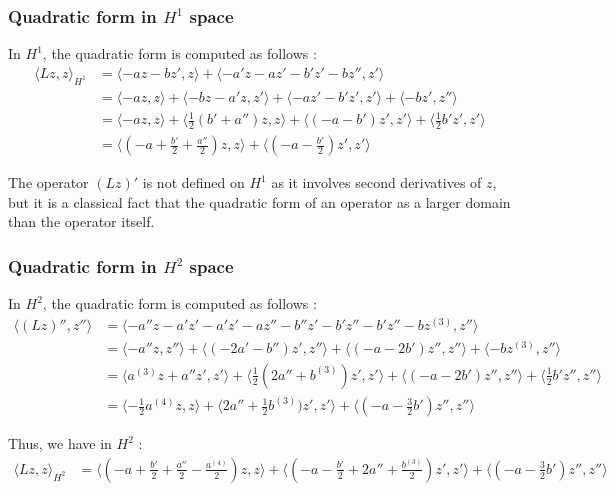 \documentclass[11pt,a4paper]{article}
\begin{document}
\subsubsection{Quadratic form in $H^1$ space}
In $H^1$, the quadratic form is computed as follows :
\begin{align*}
  \langle Lz, z \rangle_{H^1}   &=   \langle -az - bz', z \rangle +  \langle -a'z-az' - b'z'-bz'', z' \rangle \\
  &=  \langle -az, z \rangle + \langle -bz - a'z, z' \rangle + \langle - az'-b'z', z' \rangle + \langle - bz', z'' \rangle \\
  &=  \langle -az, z \rangle + \langle \frac{1}{2}(b'+a'')z, z \rangle + \langle (-a-b')z', z' \rangle + \langle \frac{1}{2} b' z', z' \rangle \\
  &=  \langle (-a+ \frac{b'}{2}+\frac{a''}{2})z, z \rangle +  \langle (-a-\frac{b'}{2})z', z' \rangle 
\end{align*}

\begin{rmq}
The operator $(Lz)'$ is not defined on $H^1$ as it involves second derivatives of $z$, but it is a classical fact that the quadratic form of an operator as a larger domain than the operator itself.
\end{rmq}

\subsubsection{Quadratic form in $H^2$ space}
In $H^2$, the quadratic form is computed as follows :
\begin{align*}
  \langle (Lz)'', z'' \rangle   &=    \langle -a''z-a'z'-a'z'-az''- b''z'-b'z''-b'z''-bz^{(3)}, z'' \rangle \\
  &= \langle -a''z, z'' \rangle +  \langle (-2a'- b'')z', z'' \rangle +  \langle (-a-2b')z'', z'' \rangle + \langle -bz^{(3)}, z'' \rangle \\
  &= \langle a^{(3)}z+ a''z', z' \rangle +  \langle \frac{1}{2} (2a''+ b^{(3)})z', z' \rangle +  \langle (-a-2b')z'', z'' \rangle + \langle \frac{1}{2} b'z'', z'' \rangle \\
  &= \langle - \frac{1}{2}a^{(4)}z, z \rangle +  \langle 2a''+ \frac{1}{2} b^{(3)})z', z' \rangle +  \langle (-a- \frac{3}{2} b')z'', z'' \rangle 
\end{align*}

Thus, we have in $H^2$ :
\begin{align*}
  \langle Lz, z \rangle_{H^2}   &=  \langle (-a+ \frac{b'}{2}+\frac{a''}{2}-\frac{a^{(4)}}{2})z, z \rangle +  \langle (-a-\frac{b'}{2} +2a''+ \frac{ b^{(3)}}{2})z', z' \rangle +  \langle (-a- \frac{3}{2} b')z'', z'' \rangle 
\end{align*}
\end{document}

